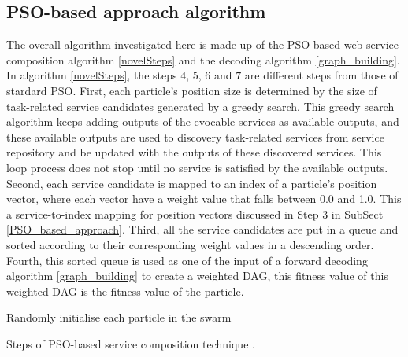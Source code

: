 \documentclass{llncs}
\begin{document}
\subsection{PSO-based approach algorithm}\label{POS-based_algomargin}
The overall algorithm investigated here is made up of the PSO-based web service composition algorithm \ref{novelSteps} and the decoding algorithm \ref{graph_building}. In algorithm \ref{novelSteps}, the  steps $4$, $5$, $6$ and $7$ are different steps from those of stardard PSO. First, each particle's position size is determined by the size of task-related service candidates generated by a greedy search. This greedy search algorithm keeps adding outputs of the evocable services as available outputs, and these available outputs are used to discovery task-related services from service repository and be updated with the outputs of these discovered services. This loop process does not stop until no service is satisfied by the available outputs. Second, each service candidate is mapped to an index of a particle’s position vector, where each vector have a weight value that falls between 0.0 and 1.0. This a service-to-index mapping for position vectors discussed in Step 3 in SubSect \ref{PSO_based_approach}. Third, all the service candidates are put in a queue and sorted according to their corresponding weight values in a descending order. Fourth, this sorted queue is used as one of the input of a forward decoding algorithm \ref{graph_building} to create a weighted DAG, this fitness value of this weighted DAG is the fitness value of the particle.
\begin{algorithm}
 \SetNlSty{}{}{:}
 Randomly initialise each particle in the swarm\;
\caption{Steps of PSO-based service composition technique \cite{da2016particle}.}
\label{novelSteps}
\end{algorithm} 
\end{document}
